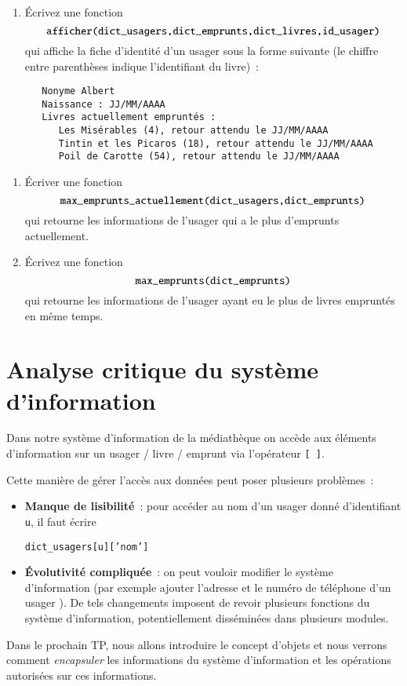 \documentclass[10pt,a4paper]{sujets-exercices}
\begin{document}
\begin{enumerate}
\item Écrivez une fonction $$\mbox{\texttt{afficher(dict\_usagers,dict\_emprunts,dict\_livres,id\_usager)}}$$ qui affiche la fiche d'identité d'un usager sous la forme suivante (le chiffre entre parenthèses indique l'identifiant du livre)~:\\
\begin{verbatim}
   Nonyme Albert
   Naissance : JJ/MM/AAAA
   Livres actuellement empruntés :
      Les Misérables (4), retour attendu le JJ/MM/AAAA
      Tintin et les Picaros (18), retour attendu le JJ/MM/AAAA
      Poil de Carotte (54), retour attendu le JJ/MM/AAAA
\end{verbatim}

\end{enumerate}


\begin{enumerate}
\item Écriver une fonction $$\mbox{\texttt{max\_emprunts\_actuellement(dict\_usagers,dict\_emprunts)}}$$ qui retourne les informations de l'usager qui a le plus d'emprunts actuellement.
\item Écrivez une fonction $$\mbox{\texttt{max\_emprunts(dict\_emprunts)}}$$ qui retourne les informations de l'usager ayant eu le plus de livres empruntés en même temps.
\end{enumerate}


\section{Analyse critique du système d'information}

Dans notre système d'information de la médiathèque on accède aux éléments d'information sur un usager / livre / emprunt via l'opérateur \verb![ ]!. 

Cette manière de gérer l'accès aux données peut poser plusieurs problèmes~:

\begin{itemize}
\item \textbf{Manque de lisibilité}~: pour accéder au nom d'un usager donné d'identifiant \texttt{u}, il faut écrire 
\begin{center}

	\texttt{dict\_usagers[u]['nom']}
\end{center}
\item \textbf{Évolutivité compliquée}~: on peut vouloir modifier le système d'information (par exemple ajouter l'adresse et le numéro de téléphone d'un usager ). De tels changements imposent de revoir plusieurs fonctions du système d'information, potentiellement disséminées dans plusieurs modules.
\end{itemize}

Dans le prochain TP, nous allons introduire le concept d'objets et nous verrons comment \emph{encapsuler} les informations du système d'information et les opérations autorisées sur ces informations.
\end{document}
